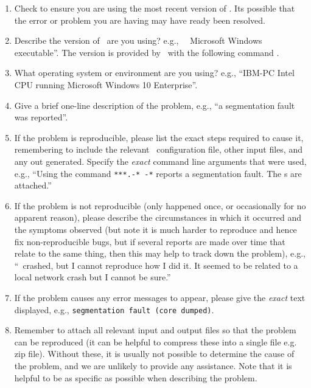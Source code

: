 \begin{enumerate}

\item Check to ensure you are using the most recent version of \CNAME. Its possible that the error or problem you are having may have ready been resolved. 

\item Describe the version of \CNAME\ are you using? e.g., \CNAME\ \VER\ Microsoft Windows executable''. The version is provided by \CNAME\ with the following command .

\item What operating system or environment are you using? e.g., ``IBM-PC Intel CPU running Microsoft Windows 10 Enterprise''.

\item Give a brief one-line description of the problem, e.g., ``a segmentation fault was reported''.

\item If the problem is reproducible, please list the exact steps required to cause it, remembering to include the relevant \CNAME\ configuration file, other input files, and any out generated. Specify the \emph{exact} command line arguments that were used, e.g., ``Using the command \texttt{***.-* -*} reports a segmentation fault. The \config s are attached.''

\item If the problem is not reproducible (only happened once, or occasionally for no apparent reason), please describe the circumstances in which it occurred and the symptoms observed (but note it is much harder to reproduce and hence fix non-reproducible bugs, but if several reports are made over time that relate to the same thing, then this may help to track down the problem), e.g., ``\CNAME\ crashed, but I cannot reproduce how I did it. It seemed to be related to a local network crash but I cannot be sure.''

\item If the problem causes any error messages to appear, please give the \emph{exact} text displayed, e.g., \texttt{segmentation fault (core dumped)}.

\item Remember to attach all relevant input and output files so that the problem can be reproduced (it can be helpful to compress these into a single file e.g. zip file). Without these, it is usually not possible to determine the cause of the problem, and we are unlikely to provide any assistance. Note that it is helpful to be as specific as possible when describing the problem.

\end{enumerate}
